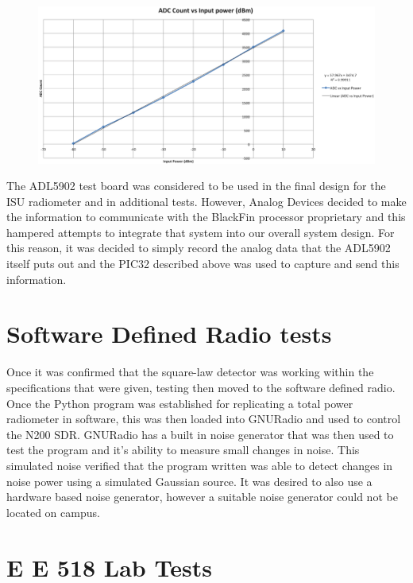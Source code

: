 \begin{figure}[h!tb] \centering

\includegraphics[width=\textwidth]{Images/Linearsquarelaw}

\label{adl5902}
\end{figure}

The ADL5902 test board was considered to be used in the final design for the ISU radiometer and in additional tests.  However, Analog Devices decided to make the information to communicate with the BlackFin processor proprietary and this hampered attempts to integrate that system into our overall system design.  For this reason, it was decided to simply record the analog data that the ADL5902 itself puts out and the PIC32 described above was used to capture and send this information.

\section{Software Defined Radio tests}
Once it was confirmed that the square-law detector was working within the specifications that were given, testing then moved to the software defined radio.  Once the Python program was established for replicating a total power radiometer in software, this was then loaded into GNURadio and used to control the N200 SDR.  GNURadio has a built in noise generator that was then used to test the program and it's ability to measure small changes in noise.  This simulated noise verified that the program written was able to detect changes in noise power using a simulated Gaussian source.  It was desired to also use a hardware based noise generator, however a suitable noise generator could not be located on campus.

\section{E E 518 Lab Tests}

